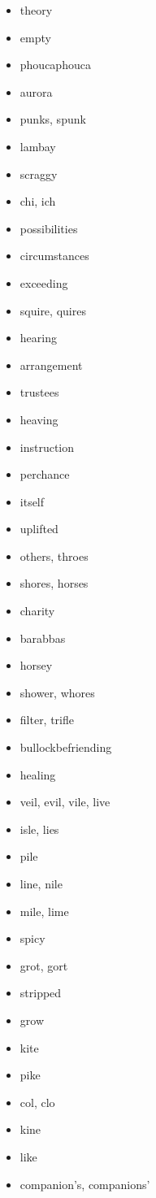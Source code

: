 \documentclass{article}
\begin{document}
\begin{itemize}
    \item theory
    \item empty
    \item phoucaphouca
    \item aurora
    \item punks, spunk
    \item lambay
    \item scraggy
    \item chi, ich
    \item possibilities
    \item circumstances
    \item exceeding
    \item squire, quires
    \item hearing
    \item arrangement
    \item trustees
    \item heaving
    \item instruction
    \item perchance
    \item itself
    \item uplifted
    \item others, throes
    \item shores, horses
    \item charity
    \item barabbas
    \item horsey
    \item shower, whores
    \item filter, trifle
    \item bullockbefriending
    \item healing
    \item veil, evil, vile, live
    \item isle, lies
    \item pile
    \item line, nile
    \item mile, lime
    \item spicy
    \item grot, gort
    \item stripped
    \item grow
    \item kite
    \item pike
    \item col, clo
    \item kine
    \item like
    \item companion's, companions'

\end{itemize}
\end{document}
